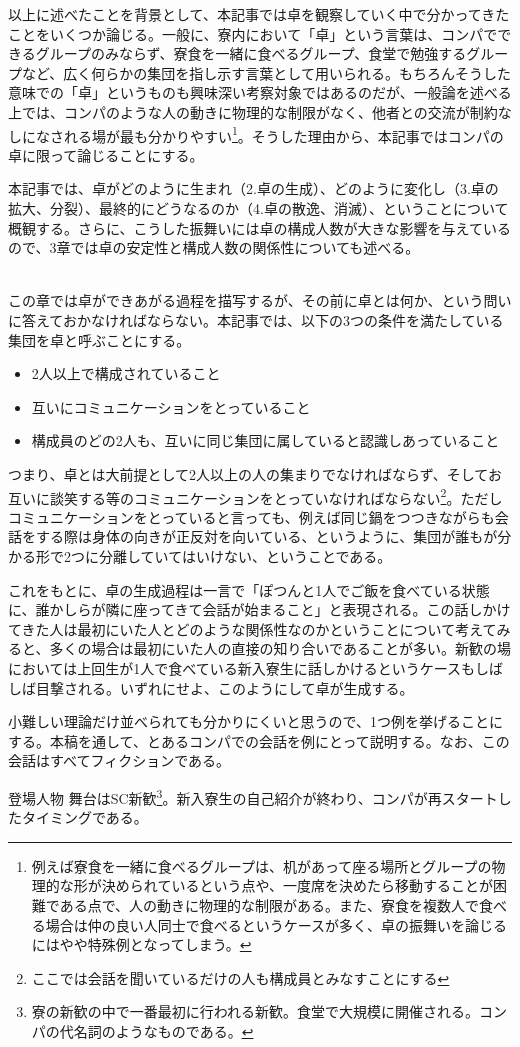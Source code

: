 \begin{multicols}{2}
以上に述べたことを背景として、本記事では卓を観察していく中で分かってきたことをいくつか論じる。一般に、寮内において「卓」という言葉は、コンパでできるグループのみならず、寮食を一緒に食べるグループ、食堂で勉強するグループなど、広く何らかの集団を指し示す言葉として用いられる。もちろんそうした意味での「卓」というものも興味深い考察対象ではあるのだが、一般論を述べる上では、コンパのような人の動きに物理的な制限がなく、他者との交流が制約なしになされる場が最も分かりやすい\footnote{例えば寮食を一緒に食べるグループは、机があって座る場所とグループの物理的な形が決められているという点や、一度席を決めたら移動することが困難である点で、人の動きに物理的な制限がある。また、寮食を複数人で食べる場合は仲の良い人同士で食べるというケースが多く、卓の振舞いを論じるにはやや特殊例となってしまう。}。そうした理由から、本記事ではコンパの卓に限って論じることにする。
\par
本記事では、卓がどのように生まれ（2.卓の生成）、どのように変化し（3.卓の拡大、分裂）、最終的にどうなるのか（4.卓の散逸、消滅）、ということについて概観する。さらに、こうした振舞いには卓の構成人数が大きな影響を与えているので、3章では卓の安定性と構成人数の関係性についても述べる。

\\
この章では卓ができあがる過程を描写するが、その前に卓とは何か、という問いに答えておかなければならない。本記事では、以下の3つの条件を満たしている集団を卓と呼ぶことにする。
\begin{itemize}
  \item 2人以上で構成されていること
  \item 互いにコミュニケーションをとっていること
  \item 構成員のどの2人も、互いに同じ集団に属していると認識しあっていること
\end{itemize}
つまり、卓とは大前提として2人以上の人の集まりでなければならず、そしてお互いに談笑する等のコミュニケーションをとっていなければならない\footnote{ここでは会話を聞いているだけの人も構成員とみなすことにする}。ただしコミュニケーションをとっていると言っても、例えば同じ鍋をつつきながらも会話をする際は身体の向きが正反対を向いている、というように、集団が誰もが分かる形で2つに分離していてはいけない、ということである。
\par
これをもとに、卓の生成過程は一言で「ぽつんと1人でご飯を食べている状態に、誰かしらが隣に座ってきて会話が始まること」と表現される。この話しかけてきた人は最初にいた人とどのような関係性なのかということについて考えてみると、多くの場合は最初にいた人の直接の知り合いであることが多い。新歓の場においては上回生が1人で食べている新入寮生に話しかけるというケースもしばしば目撃される。いずれにせよ、このようにして卓が生成する。
\par
小難しい理論だけ並べられても分かりにくいと思うので、1つ例を挙げることにする。本稿を通して、とあるコンパでの会話を例にとって説明する。なお、この会話はすべてフィクションである。
\par
\dotfill
\begin{itembox}[l]{登場人物}
  舞台はSC新歓\footnote{寮の新歓の中で一番最初に行われる新歓。食堂で大規模に開催される。コンパの代名詞のようなものである。}。新入寮生の自己紹介が終わり、コンパが再スタートしたタイミングである。
  

\end{itembox}
\end{multicols}
